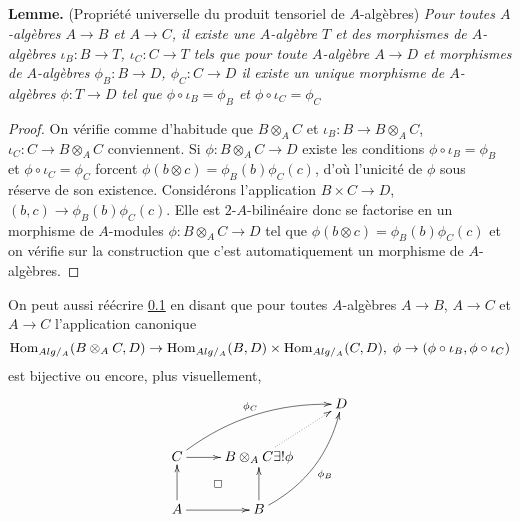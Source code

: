 \subsection{}\label{PTAlgUniv}\textbf{Lemme.} (Propriété universelle du produit tensoriel de $A$-algèbres) \textit{Pour toutes $A$-algèbres $ A\rightarrow B$ et $ A\rightarrow C$, il existe une $A$-algèbre $T$ et des morphismes de $A$-algèbres $\iota_B:B\rightarrow T$, $\iota_C:C\rightarrow T$ tels que pour toute $A$-algèbre $A\rightarrow D$ et morphismes de $A$-algèbres $\phi_B:B\rightarrow D$, $\phi_C:C\rightarrow D$ il existe un unique morphisme de $A$-algèbres $\phi:T\rightarrow D$ tel que $\phi\circ \iota_B=\phi_B$ et $\phi\circ \iota_C=\phi_C$}
\begin{proof}On  vérifie comme d'habitude que  $B\otimes_AC$ et $\iota_B:B\rightarrow B\otimes_AC$, $\iota_C:C\rightarrow B\otimes_AC$ conviennent. Si $\phi:B\otimes_AC\rightarrow D$ existe les conditions $\phi\circ \iota_B=\phi_B$ et $\phi\circ \iota_C=\phi_C$ forcent $\phi(b\otimes c)=\phi_B(b)\phi_C(c)$, d'où l'unicité de $\phi$ sous réserve de son existence. Considérons   l'application $ B\times C\rightarrow D$, $(b,c)\rightarrow \phi_B(b)\phi_C(c)$. Elle est $2$-$A$-bilinéaire donc se factorise en un morphisme de $A$-modules $\phi:B\otimes_A C\rightarrow D$ tel que $\phi(b\otimes c)=\phi_B(b)\phi_C(c)$ et on vérifie sur la construction que c'est automatiquement un morphisme de $A$-algèbres.  \end{proof}



 On peut aussi réécrire \ref{PTAlgUniv} en disant que pour toutes $A$-algèbres $ A\rightarrow B$, $ A\rightarrow C$  et $A\rightarrow C$ l'application canonique
$$\operatorname{Hom}_{Alg/_A}(B\otimes_AC,D)\rightarrow \operatorname{Hom}_{Alg/_A}(B ,D)\times \operatorname{Hom}_{Alg/_A}( C,D),\; \phi\rightarrow (\phi\circ \iota_B,\phi\circ \iota_C)$$
est bijective ou encore, plus visuellement,
$$\xymatrix{&&D\\
C\ar[r]\ar@/^1pc/[urr]^{\phi_C}&B\otimes_AC\ar@{.>}[ur]{\exists ! \phi}&\\
A\ar[u]\ar[r]\ar@{}[ur]|{\square}&B\ar[u]\ar@/_1pc/[uur]_{\phi_B}&}$$




